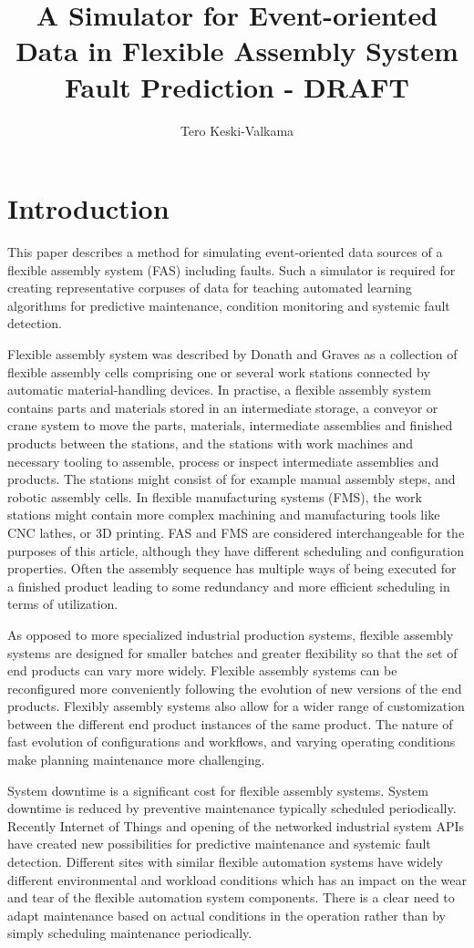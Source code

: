 \documentclass[procedia]{easychair}
\title{A Simulator for Event-oriented Data in Flexible Assembly System Fault Prediction - DRAFT}
\author{Tero Keski-Valkama}
\begin{document}
\begin{abstract}

\end{abstract}

\section{Introduction}
This paper describes a method for simulating event-oriented data sources of a flexible assembly system (FAS) including faults. Such a simulator is required for creating representative corpuses
of data for teaching automated learning algorithms for predictive maintenance, condition monitoring and systemic fault detection.

Flexible assembly system was described by Donath and Graves \cite{donath1988flexible} as a collection of flexible assembly cells comprising one or several work stations connected by automatic material-handling devices.
In practise, a flexible assembly system contains parts and materials stored in an intermediate storage,
a conveyor or crane system to move the parts, materials, intermediate assemblies and finished products between the stations, and the stations with work machines and necessary tooling
to assemble, process or inspect intermediate assemblies and products. The stations might consist of for example manual assembly steps, and robotic assembly cells. In flexible manufacturing systems (FMS),
the work stations might contain more complex machining and manufacturing tools like CNC lathes, or 3D printing. FAS and FMS are considered interchangeable for the purposes of this article, although
they have different scheduling and configuration properties.
Often the assembly sequence has multiple ways of being executed for a finished product leading to some redundancy and more efficient scheduling in terms of utilization.

As opposed to more specialized industrial production systems, flexible assembly systems are designed for smaller batches and greater flexibility so that the set of end products can vary more widely.
Flexible assembly systems can be reconfigured more conveniently following the evolution of new versions of the end products. Flexibly assembly systems also allow for a wider range
of customization between the different end product instances of the same product. The nature of fast evolution of configurations and workflows, and varying operating conditions make
planning maintenance more challenging.

System downtime is a significant cost for flexible assembly systems. System downtime is reduced by preventive maintenance typically scheduled periodically.
Recently Internet of Things and opening of the networked industrial system APIs have created new possibilities for predictive maintenance and systemic fault detection. Different sites with similar
flexible automation systems have widely different environmental and workload conditions which has an impact on the wear and tear of the flexible automation system components.
There is a clear need to adapt maintenance based on actual conditions in the operation rather than by simply scheduling maintenance periodically\cite{hashemian2011state}.
\end{document}
